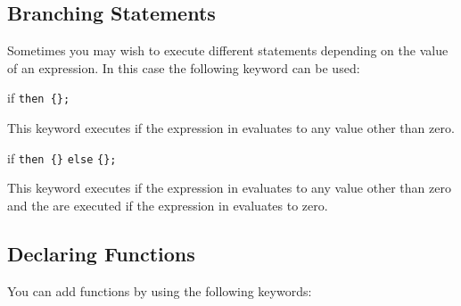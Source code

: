 	
	


\subsection{Branching Statements}

	Sometimes you may wish to execute different statements
	depending on the value of an expression. In this
	case the following keyword can be used:

\begin{math-keyword}{{if}  \texttt{then \{}\texttt{\};}}

	This keyword executes  if the expression in 
	evaluates to any value other than zero.

\end{math-keyword}

\begin{math-keyword}{{if}  \texttt{then \{}\texttt{\}} \texttt{else} \texttt{\{}\texttt{\}}\texttt{;}}

	This keyword executes  if the expression in 
	evaluates to any value other than zero and the  are executed if
	the expression in  evaluates to zero.

\begin{codeexample}[]
\end{codeexample}
\end{math-keyword}

\subsection{Declaring Functions}

	You can add functions by using the following keywords:

